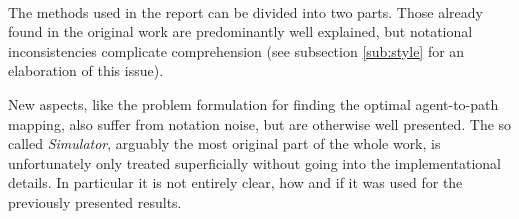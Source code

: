 \documentclass[../review.tex]{subfiles}
\begin{document}
 \textcolor{green}{\Large\checkmark}\\
The methods used in the report can be divided into two parts. Those already found in the original work are predominantly well explained, but notational inconsistencies complicate comprehension (see subsection \ref{sub:style} for an elaboration of this issue).

New aspects, like the problem formulation for finding the optimal agent-to-path mapping, also suffer from notation noise, but are otherwise well presented. The so called \textit{Simulator}, arguably the most original part of the whole work, is unfortunately only treated superficially without going into the implementational details. In particular it is not entirely clear, how and if it was used for the previously presented results.
\end{document}

